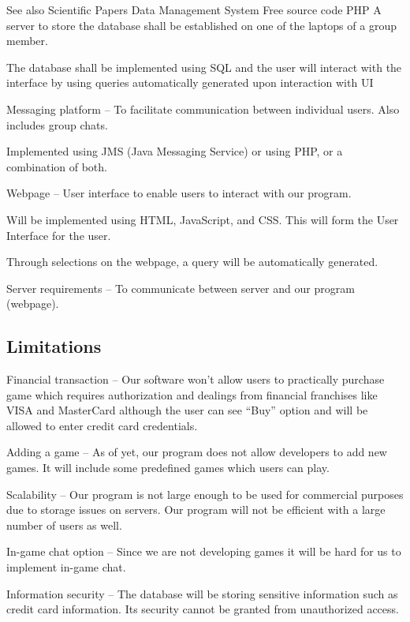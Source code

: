 \documentclass{article}
\begin{document}
See also  Scientific Papers Data Management System Free source code PHP
A server to store the database shall be established on one of the laptops of a group member.

The database shall be implemented using SQL and the user will interact with the interface by using queries automatically generated upon interaction with UI

Messaging platform – To facilitate communication between individual users. Also includes group chats.

Implemented using JMS (Java Messaging Service) or using PHP, or a combination of both.

Webpage – User interface to enable users to interact with our program.

Will be implemented using HTML, JavaScript, and CSS. This will form the User Interface for the user.

Through selections on the webpage, a query will be automatically generated.

Server requirements – To communicate between server and our program (webpage).

 \subsection{Limitations}
 Financial transaction – Our software won’t allow users to practically purchase game which requires authorization and dealings from financial franchises like VISA and MasterCard although the user can see “Buy” option and will be allowed to enter credit card credentials.

Adding a game – As of yet, our program does not allow developers to add new games. It will include some predefined games which users can play.

Scalability – Our program is not large enough to be used for commercial purposes due to storage issues on servers. Our program will not be efficient with a large number of users as well.

In-game chat option – Since we are not developing games it will be hard for us to implement in-game chat.

Information security – The database will be storing sensitive information such as credit card information. Its security cannot be granted from unauthorized access.


 
 
 
 
 
 
 
 
 
 
 
 
 
 
 
 
 
 
 
 
 
 
 
 
 
 
 
\end{document}
